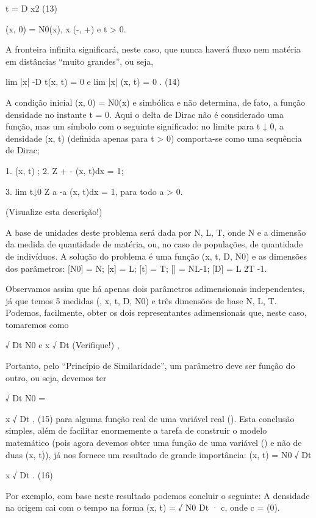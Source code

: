 \partial \rho 
\partial t = D
\rho 
\partial x2
(13)

\rho (x, 0) = N0\delta(x), x \in (-\infty , +\infty ) e t > 0.

A fronteira infinita significará, neste caso, que nunca haverá fluxo nem matéria em distâncias “muito grandes”, ou seja,

lim
|x|\to \infty 
-D
\partial \rho 
\partial t(x, t) = 0 e lim
|x|\to \infty 
\rho (x, t) = 0 . (14)

A condição inicial \rho (x, 0) = N0\delta(x) e simbólica e não determina, de fato, a função densidade no instante t = 0. Aqui o delta de Dirac \delta não é considerado uma função, mas um símbolo com o seguinte significado: no limite para t ↓ 0, a densidade \rho (x, t) (definida
apenas para t > 0) comporta-se como uma sequência de Dirac;

1. \rho (x, t) ;
2. Z +\infty 
-\infty 
\rho (x, t)dx = 1;

3. lim
t↓0
Z a
-a
\rho (x, t)dx = 1, para todo a > 0.

(Visualize esta descrição!)

A base de unidades deste problema será dada por {N, L, T}, onde N e a dimensão da medida de quantidade de matéria, ou, no caso de populações, de quantidade de indivíduos. A solução do problema é uma função \rho (x, t, D, N0) e as dimensões dos
parâmetros: [N0] = N; [x] = L; [t] = T; [\rho ] = NL-1; [D] = L
2T
-1.

Observamos assim que há apenas dois parâmetros adimensionais independentes, já que temos 5 medidas (\rho , x, t, D, N0) e três dimensões de base {N, L, T}. Podemos, facilmente, obter os dois representantes adimensionais que, neste caso, tomaremos como

\rho √
Dt
N0
e
x
√
Dt
(Verifique!) ,

Portanto, pelo “Princípio de Similaridade”, um parâmetro deve ser função do outro, ou seja, devemos ter

\rho 
√
Dt
N0
= \Phi

x
√
Dt
, (15)
para alguma função real de uma variável real \Phi(\xi). Esta conclusão simples, além de facilitar enormemente a tarefa de construir o modelo matemático (pois agora devemos obter uma função de uma variável \Phi(\xi) e não de duas \rho (x, t)), já nos fornece um resultado de grande importância:
\rho (x, t) = N0
√
Dt
\Phi

x
√
Dt
. (16)

Por exemplo, com base neste resultado podemos concluir o seguinte:
\Rightarrow A densidade na origem cai com o tempo na forma \rho (x, t) = √
N0
Dt · c, onde c = \Phi(0).

